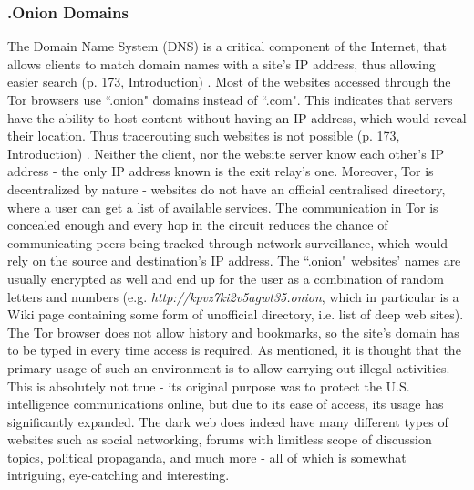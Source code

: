 \documentclass[a4paper, 12pt, titlepage]{article}
\begin{document}
\subsubsection{.Onion Domains}
The Domain Name System (DNS) is a critical component of the Internet, that allows clients to match domain names with a site's IP address, thus allowing easier search (p. 173, Introduction) \cite{OnionLeak}. Most of the websites accessed through the Tor browsers use ``.onion" domains instead of ``.com".  This indicates that servers have the ability to host content without having an IP address, which would reveal their location. Thus tracerouting such websites is not possible (p. 173, Introduction) \cite{OnionLeak}. Neither the client, nor the website server know each other's IP address - the only IP address known is the exit relay's one. Moreover, Tor is decentralized by nature - websites do not have an official centralised directory, where a user can get a list of available services. The communication in Tor is concealed enough and every hop in the circuit reduces the chance of communicating peers being tracked through network surveillance, which would rely on the source and destination's IP address. The ``.onion" websites' names are usually encrypted as well and end up for the user as a combination of random letters and numbers (e.g. \textit{http://kpvz7ki2v5agwt35.onion}, which in particular is a Wiki page containing some form of unofficial directory, i.e. list of deep web sites). The Tor browser does not allow history and bookmarks, so the site's domain has to be typed in every time access is required. As mentioned, it is thought that the primary usage of such an environment is to allow carrying out illegal activities. This is absolutely not true - its original purpose was to protect the U.S. intelligence communications online, but due to its ease of access, its usage has significantly expanded. The dark web does indeed have many different types of websites such as social networking, forums with limitless scope of discussion topics, political propaganda, and much more - all of which is somewhat intriguing, eye-catching and interesting.
\end{document}
